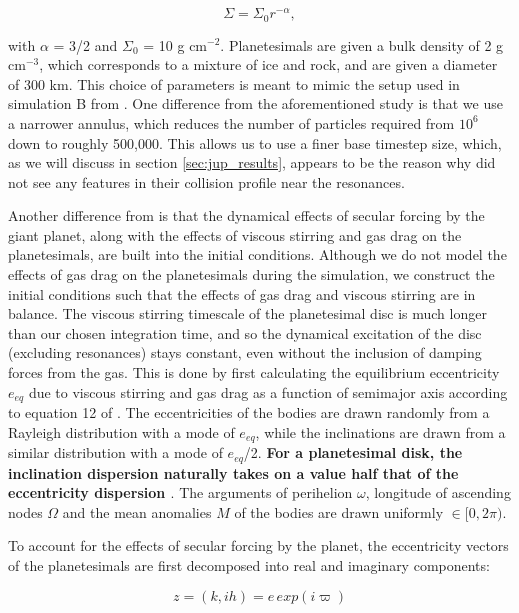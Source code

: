 \begin{equation}\label{eq:surf_den}
	\Sigma = \Sigma_{0} r^{-\alpha},
\end{equation}

\noindent with $\alpha$ = 3/2 and $\Sigma_{0}$ = 10 g cm$^{-2}$. Planetesimals are given a bulk density of 2 g cm$^{-3}$, 
which corresponds to a mixture of ice and rock, and are given a diameter of 300 km. This choice of parameters is meant to 
mimic the setup used in simulation B from \cite{richardson00}. One difference from the aforementioned study is that we use a 
narrower annulus, which reduces the number of particles required from $10^6$ down to roughly 500,000. This allows us to use a 
finer base timestep size, which, as we will discuss in section \ref{sec:jup_results}, appears to be the reason why \cite{richardson00} did not see any features in their collision profile near the resonances.

Another difference from \cite{richardson00} is that the dynamical effects of secular forcing by the giant planet, along with the 
effects of viscous stirring and gas drag on the planetesimals, are built into the initial conditions. Although we do not model the 
effects of gas drag on the planetesimals during the simulation, we construct the initial conditions such that the effects of gas drag 
and viscous stirring are in balance. The viscous stirring timescale of the planetesimal disc is much longer than our chosen 
integration time, and so the dynamical excitation of the disc (excluding resonances) stays constant, even without the inclusion of 
damping forces from the gas. This is done by first calculating the equilibrium eccentricity $e_{eq}$ due to viscous stirring and 
gas drag as a function of semimajor axis according to equation 12 of \cite{kokubo02}. The eccentricities of the bodies are drawn 
randomly from a Rayleigh distribution with a mode of $e_{eq}$, while the inclinations are drawn from a similar distribution with a 
mode of $e_{eq}$/2. \textbf{For a planetesimal disk, the inclination dispersion naturally takes on a value half that of the eccentricity dispersion \cite{ida93a}}. The arguments of perihelion $\omega$, longitude of ascending nodes $\Omega$ and the 
mean anomalies $M$ of the bodies are drawn uniformly $\in [0, 2 \pi)$.

To account for the effects of secular forcing by the planet, the eccentricity vectors of the planetesimals are first decomposed into 
real and imaginary components:

\begin{equation}\label{eq:kh}
	z = (k, ih) = e \, exp(i \varpi)
\end{equation}

